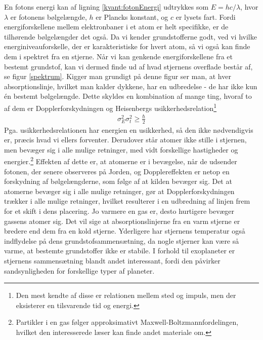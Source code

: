 En fotons energi kan af ligning \eqref{kvant:fotonEnergi} udtrykkes som $E=hc/\lambda$, hvor $\lambda$ er fotonens bølgelængde, $h$ er Plancks konstant, og $c$ er lysets fart. Fordi energiforskellene mellem elektronbaner i et atom er helt specifikke, er de tilhørende bølgelængder det også. Da vi kender grundstofferne godt, ved vi hvilke energiniveauforskelle, der er karakteristiske for hvert atom, så vi også kan finde dem i spektret fra en stjerne. Når vi kan genkende energiforskellene fra et bestemt grundstof, kan vi dermed finde ud af hvad stjernens overflade består af, se figur \ref{spektrum}. Kigger man grundigt på denne figur ser man, at hver absorptionslinje, hvilket man kalder dykkene, har en udbredelse - de har ikke kun én bestemt bølgelængde. Dette skyldes en kombination af mange ting, hvoraf to af dem er Dopplerforskydningen og Heisenbergs usikkerhedsrelation\footnote{Den mest kendte af disse er relationen mellem sted og impuls, men der eksisterer en tilsvarende tid og energi.}
\begin{align}
    \sigma_E^2\sigma_t^2 \geq \frac{\hbar}{2}
\end{align}
Pga. usikkerhedsrelationen har energien en usikkerhed, så den ikke nødvendigvis er, præcis hvad vi ellers forventer. Derudover står atomer ikke stille i stjernen, men bevæger sig i alle mulige retninger, med vidt forskellige hastigheder og energier.\footnote{Partikler i en gas følger approksimativt Maxwell-Boltzmannfordelingen, hvilket den interesserede læser kan finde andet materiale om.} Effekten af dette er, at atomerne er i bevægelse, når de udsender fotonen, der senere observeres på Jorden, og Dopplereffekten er netop en forskydning af bølgelængderne, som følge af at kilden bevæger sig. Det at atomerne bevæger sig i alle mulige retninger, gør at Dopplerforskydningen trækker i alle mulige retninger, hvilket resulterer i en udbredning af linjen frem for et skift i dens placering. Jo varmere en gas er, desto hurtigere bevæger gassens atomer sig. Det vil sige at absorptionslinjerne fra en varm stjerne er bredere end dem fra en kold stjerne. Yderligere har stjernens temperatur også indflydelse på dens grundstofsammensætning, da nogle stjerner kan være så varme, at bestemte grundstoffer ikke er stabile. I forhold til exoplaneter er stjernens sammensætning blandt andet interessant, fordi den påvirker sandsynligheden for forskellige typer af planeter.